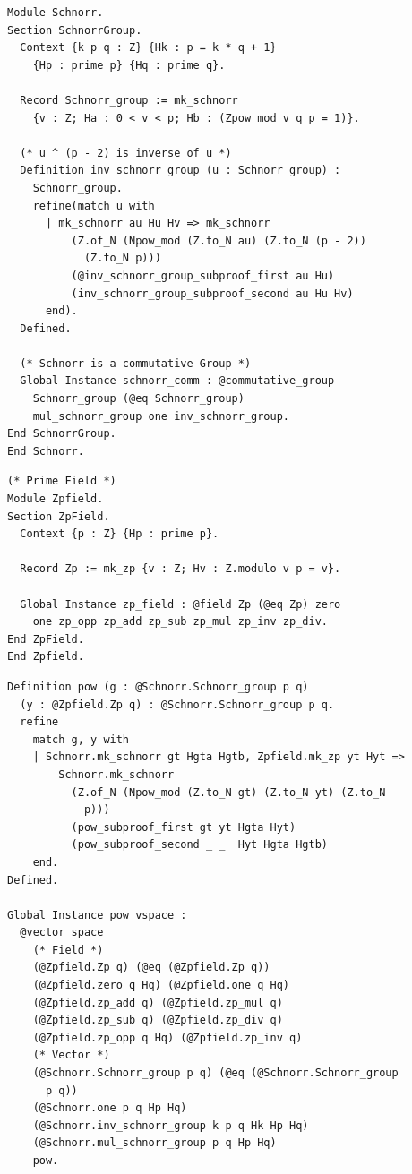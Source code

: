 \documentclass[sigconf,anonymous,review]{acmart}
\begin{document}
\begin{lstlisting}[frame=single, language=Coq, caption={Rocq Encoding of the Schnorr Group},
  label={group_def},captionpos=t, basicstyle=\ttfamily\footnotesize,
  abovecaptionskip=-\medskipamount]
Module Schnorr.
Section SchnorrGroup. 
  Context {k p q : Z} {Hk : p = k * q + 1}
    {Hp : prime p} {Hq : prime q}.

  Record Schnorr_group := mk_schnorr 
    {v : Z; Ha : 0 < v < p; Hb : (Zpow_mod v q p = 1)}.

  (* u ^ (p - 2) is inverse of u *)
  Definition inv_schnorr_group (u : Schnorr_group) :
    Schnorr_group.
    refine(match u with 
      | mk_schnorr au Hu Hv => mk_schnorr
          (Z.of_N (Npow_mod (Z.to_N au) (Z.to_N (p - 2))
            (Z.to_N p)))
          (@inv_schnorr_group_subproof_first au Hu)
          (inv_schnorr_group_subproof_second au Hu Hv)
      end).
  Defined.

  (* Schnorr is a commutative Group *)
  Global Instance schnorr_comm : @commutative_group 
    Schnorr_group (@eq Schnorr_group) 
    mul_schnorr_group one inv_schnorr_group.
End SchnorrGroup.
End Schnorr.
\end{lstlisting}

\begin{lstlisting}[frame=single, language=Coq, caption={Rocq Encoding of Prime Field},
  label={field_def},captionpos=t, basicstyle=\ttfamily\footnotesize,
  abovecaptionskip=-\medskipamount]
(* Prime Field *)
Module Zpfield.
Section ZpField.
  Context {p : Z} {Hp : prime p}.

  Record Zp := mk_zp {v : Z; Hv : Z.modulo v p = v}.

  Global Instance zp_field : @field Zp (@eq Zp) zero 
    one zp_opp zp_add zp_sub zp_mul zp_inv zp_div.
End ZpField. 
End Zpfield.
\end{lstlisting}

\begin{lstlisting}[frame=single, language=Coq, caption={Vector Space Instantiation},
  label={vec_space},captionpos=t, basicstyle=\ttfamily\footnotesize,
  abovecaptionskip=-\medskipamount]
Definition pow (g : @Schnorr.Schnorr_group p q) 
  (y : @Zpfield.Zp q) : @Schnorr.Schnorr_group p q.
  refine 
    match g, y with 
    | Schnorr.mk_schnorr gt Hgta Hgtb, Zpfield.mk_zp yt Hyt => 
        Schnorr.mk_schnorr  
          (Z.of_N (Npow_mod (Z.to_N gt) (Z.to_N yt) (Z.to_N
            p))) 
          (pow_subproof_first gt yt Hgta Hyt)
          (pow_subproof_second _ _  Hyt Hgta Hgtb)
    end.
Defined.

Global Instance pow_vspace : 
  @vector_space 
    (* Field *)
    (@Zpfield.Zp q) (@eq (@Zpfield.Zp q))
    (@Zpfield.zero q Hq) (@Zpfield.one q Hq)
    (@Zpfield.zp_add q) (@Zpfield.zp_mul q)
    (@Zpfield.zp_sub q) (@Zpfield.zp_div q)
    (@Zpfield.zp_opp q Hq) (@Zpfield.zp_inv q)
    (* Vector *)
    (@Schnorr.Schnorr_group p q) (@eq (@Schnorr.Schnorr_group
      p q))
    (@Schnorr.one p q Hp Hq) 
    (@Schnorr.inv_schnorr_group k p q Hk Hp Hq)
    (@Schnorr.mul_schnorr_group p q Hp Hq)
    pow.
\end{lstlisting}
\end{document}
